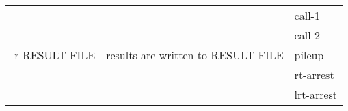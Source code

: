 {\small
\begin{tabular}{@{}p{}p{}l@{}}
\multirow{5}{=}{-r RESULT-FILE} & \multirow{5}{=}{results are written to RESULT-FILE} & call-1 \\
 &  & call-2 \\
 &  & pileup \\
 &  & rt-arrest \\
 &  & lrt-arrest \\
\end{tabular}\\
}
